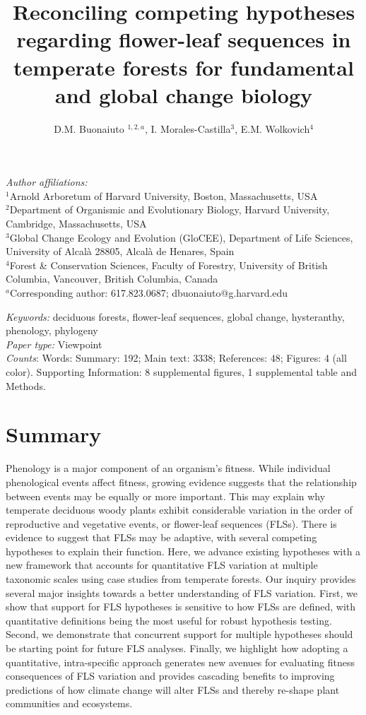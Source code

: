 \documentclass[11pt]{article}
\title{Reconciling competing hypotheses regarding flower-leaf sequences in temperate forests for fundamental and global change biology}
\date{}
\author{D.M. Buonaiuto $^{1,2,a}$, I. Morales-Castilla$^{3}$, E.M. Wolkovich$^{4}$}
\begin{document}
\maketitle
\linenumbers
\noindent \emph{Author affiliations:}\\
\noindent $^1$Arnold Arboretum of Harvard University, Boston, Massachusetts, USA\\
$^2$Department of Organismic and Evolutionary Biology, Harvard University, Cambridge, Massachusetts, USA\\
$^3$Global Change Ecology and Evolution (GloCEE), Department of Life Sciences, University of Alcal\`a  28805, Alcal\`a de Henares, Spain\\
$^4$Forest \& Conservation Sciences, Faculty of Forestry, University of British Columbia, Vancouver, British Columbia, Canada\\
$^a$Corresponding author: 617.823.0687; dbuonaiuto@g.harvard.edu

\noindent \emph{Keywords:} deciduous forests, flower-leaf sequences, global change, hysteranthy, phenology, phylogeny \\ %
\emph{Paper type:} Viewpoint\\
 \emph{Counts}: Words: Summary: 192; Main text: 3338; References: 48;  Figures: 4 (all color). Supporting Information: 8 supplemental figures, 1 supplemental table and Methods.
\newpage

\section*{Summary}
Phenology is a major component of an organism's fitness. While individual phenological events affect fitness, growing evidence suggests that the relationship between events may be equally or more important. This may explain why temperate deciduous woody plants exhibit considerable variation in the order of reproductive and vegetative events, or flower-leaf sequences (FLSs). There is evidence to suggest that FLSs may be adaptive, with several competing hypotheses to explain their function. Here, we advance existing hypotheses with a new framework that accounts for quantitative FLS variation at multiple taxonomic scales using case studies from temperate forests. Our inquiry provides several major insights towards a better understanding of FLS variation. First, we show that support for FLS hypotheses is sensitive to how FLSs are defined, with quantitative definitions being the most useful for robust hypothesis testing. Second, we demonstrate that concurrent support for multiple hypotheses should be starting point for future FLS analyses. Finally, we highlight how adopting a quantitative, intra-specific approach generates new avenues for evaluating fitness consequences of FLS variation and provides cascading benefits to improving predictions of how climate change will alter FLSs and thereby re-shape plant communities and ecosystems.
\end{document}
